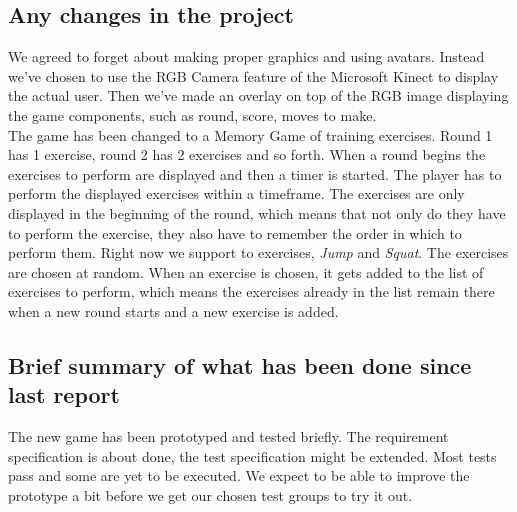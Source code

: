 \documentclass[12pt]{report}
\begin{document}
\subsection*{Any changes in the project}
We agreed to forget about making proper graphics and using avatars. Instead we've chosen to use the RGB Camera feature of the Microsoft Kinect to display the actual user. Then we've made an overlay on top of the RGB image displaying the game components, such as round, score, moves to make.\\
The game has been changed to a Memory Game of training exercises. Round 1 has 1 exercise, round 2 has 2 exercises and so forth. When a round begins the exercises to perform are displayed and then a timer is started. The player has to perform the displayed exercises within a timeframe. The exercises are only displayed in the beginning of the round, which means that not only do they have to perform the exercise, they also have to remember the order in which to perform them. Right now we support to exercises, \emph{Jump} and \emph{Squat}. The exercises are chosen at random. When an exercise is chosen, it gets added to the list of exercises to perform, which means the exercises already in the list remain there when a new round starts and a new exercise is added.

\subsection*{Brief summary of what has been done since last report}
The new game has been prototyped and tested briefly. The requirement specification is about done, the test specification might be extended. Most tests pass and some are yet to be executed. We expect to be able to improve the prototype a bit before we get our chosen test groups to try it out.
\end{document}
